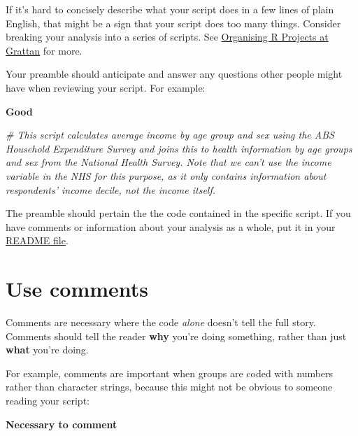 \documentclass[]{book}
\newenvironment{Shaded}{\begin{snugshade}}{\end{snugshade}}
\newcommand{\CommentTok}[1]{\textcolor[rgb]{0.56,0.35,0.01}{\textit{#1}}}
\newcommand{\DecValTok}[1]{\textcolor[rgb]{0.00,0.00,0.81}{#1}}
\newcommand{\KeywordTok}[1]{\textcolor[rgb]{0.13,0.29,0.53}{\textbf{#1}}}
\newcommand{\NormalTok}[1]{#1}
\newcommand{\OperatorTok}[1]{\textcolor[rgb]{0.81,0.36,0.00}{\textbf{#1}}}
\newcommand{\StringTok}[1]{\textcolor[rgb]{0.31,0.60,0.02}{#1}}
\begin{document}
If it's hard to concisely describe what your script does in a few lines of plain English, that might be a sign that your script does too many things. Consider breaking your analysis into a series of scripts. See \protect\hyperlink{organising-projects}{Organising R Projects at Grattan} for more.

Your preamble should anticipate and answer any questions other people might have when reviewing your script. For example:

\textbf{Good}

\begin{Shaded}
\begin{Highlighting}[]
\CommentTok{# This script calculates average income by age group and sex using the ABS Household Expenditure Survey and joins this to health information by age groups and sex from the National Health Survey. Note that we can't use the income variable in the NHS for this purpose, as it only contains information about respondents' income decile, not the income itself.}
\end{Highlighting}
\end{Shaded}

The preamble should pertain the the code contained in the specific script. If you have comments or information about your analysis as a whole, put it in your \protect\hyperlink{README}{README file}.

\hypertarget{use-comments}{%
\section{Use comments}\label{use-comments}}

Comments are necessary where the code \emph{alone} doesn't tell the full story. Comments should tell the reader \textbf{why} you're doing something, rather than just \textbf{what} you're doing.

For example, comments are important when groups are coded with numbers rather than character strings, because this might not be obvious to someone reading your script:

\textbf{Necessary to comment}

\begin{Shaded}
\end{Shaded}
\end{document}
